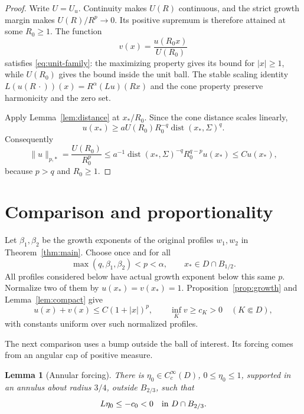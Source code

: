 \documentclass[11pt]{article}
\newtheorem{lemma}[theorem]{Lemma}
\numberwithin{equation}{section}
\newcommand{\dist}{\operatorname{dist}}
\begin{document}
\begin{proof}
Write \(U=U_u\). Continuity makes \(U(R)\) continuous, and the strict
growth margin makes \(U(R)/R^p\to0\). Its positive supremum is therefore
attained at some \(R_0\ge1\). The function
\[
 v(x)=\frac{u(R_0x)}{U(R_0)}
\]
satisfies \eqref{eq:unit-family}: the maximizing property gives its bound
for \(|x|\ge1\), while \(U(R_0)\) gives the bound inside the unit ball.
The stable scaling identity
\(L(u(R\,\cdot))(x)=R^\alpha(Lu)(Rx)\) and the cone property preserve
harmonicity and the zero set.

Apply Lemma~\ref{lem:distance} at \(x_*/R_0\). Since the cone distance
scales linearly,
\[
 u(x_*)\ge aU(R_0)R_0^{-q}\dist(x_*,\Sigma)^q.
\]
Consequently
\[
 \|u\|_{p,*}=\frac{U(R_0)}{R_0^p}
 \le a^{-1}\dist(x_*,\Sigma)^{-q}R_0^{q-p}u(x_*)
 \le C u(x_*),
\]
because \(p>q\) and \(R_0\ge1\).
\end{proof}

\section{Comparison and proportionality}\label{sec:rigidity}

Let \(\beta_1,\beta_2\) be the growth exponents of the original profiles
\(w_1,w_2\) in Theorem~\ref{thm:main}. Choose once and for all
\begin{equation}\label{eq:p-choice}
 \max(q,\beta_1,\beta_2)<p<\alpha,
 \qquad x_*\in D\cap B_{1/2}.
\end{equation}
All profiles considered below have actual growth exponent below this same
\(p\). Normalize two of them by \(u(x_*)=v(x_*)=1\).
Proposition~\ref{prop:growth} and Lemma~\ref{lem:compact} give
\begin{equation}\label{eq:normalized-growth}
 u(x)+v(x)\le C(1+|x|)^p,
 \qquad \inf_K v\ge c_K>0\quad(K\Subset D),
\end{equation}
with constants uniform over such normalized profiles.

The next comparison uses a bump outside the ball of interest. Its forcing
comes from an angular cap of positive measure.

\begin{lemma}[Annular forcing]\label{lem:annulus}
There is \(\eta_0\in C_c^\infty(D)\), \(0\le\eta_0\le1\), supported
in an annulus about radius \(3/4\), outside \(B_{2/3}\), such that
\begin{equation}\label{eq:annular-forcing}
 L\eta_0\le-c_0<0\quad\hbox{in }D\cap B_{2/3}.
\end{equation}
\end{lemma}
\end{document}
